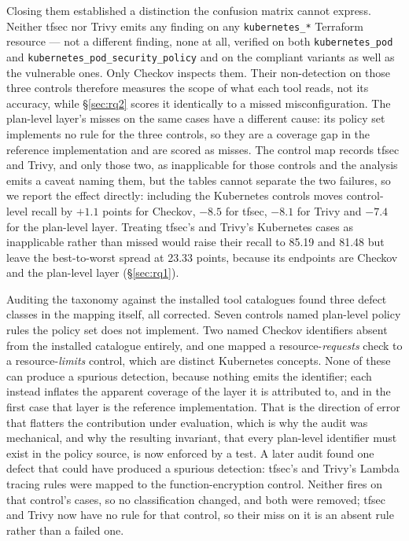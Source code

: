 \documentclass[smallextended]{svjour3}
\begin{document}
Closing them established a distinction the confusion matrix cannot express.
Neither tfsec nor Trivy emits any finding
on any \texttt{kubernetes\_*} Terraform resource --- not a different finding, none
at all, verified on both \texttt{kubernetes\_pod} and
\texttt{kubernetes\_pod\_security\_policy} and on the compliant variants as well as
the vulnerable ones. Only Checkov inspects them. Their non-detection on those three
controls therefore measures the scope of what each tool reads, not its accuracy,
while \S\ref{sec:rq2} scores it identically to a missed misconfiguration. The
plan-level layer's misses on the same cases have a different cause: its policy
set implements no rule for the three controls, so they are a coverage gap in the
reference implementation and are scored as misses. The control map records tfsec
and Trivy, and only those two, as inapplicable for those controls and the
analysis emits a caveat naming them, but the tables cannot separate the two
failures, so we report the effect directly: including the Kubernetes controls
moves control-level recall by $+1.1$ points for Checkov, $-8.5$ for tfsec, $-8.1$
for Trivy and $-7.4$ for the plan-level layer. Treating tfsec's and Trivy's
Kubernetes cases as inapplicable rather than missed would raise their recall to
85.19 and 81.48 but leave the best-to-worst spread at 23.33 points, because its
endpoints are Checkov and the plan-level layer (\S\ref{sec:rq1}).

Auditing the taxonomy against the installed tool catalogues found three defect
classes in the mapping itself, all corrected. Seven controls named plan-level
policy rules the policy set does not implement. Two named Checkov identifiers
absent from the installed catalogue entirely, and one mapped a
resource-\emph{requests} check to a resource-\emph{limits} control, which are
distinct Kubernetes concepts. None of these can produce a spurious detection,
because nothing emits the identifier; each instead inflates the apparent coverage
of the layer it is attributed to, and in the first case that layer is the
reference implementation. That is the direction of error that flatters the
contribution under evaluation, which is why the audit was mechanical, and why the
resulting invariant, that every plan-level identifier must exist in the policy
source, is now enforced by a test. A later audit found one defect that could have
produced a spurious detection: tfsec's and Trivy's Lambda tracing rules were
mapped to the function-encryption control. Neither fires on that control's cases,
so no classification changed, and both were removed; tfsec and Trivy now have no
rule for that control, so their miss on it is an absent rule rather than a failed
one.
\end{document}
